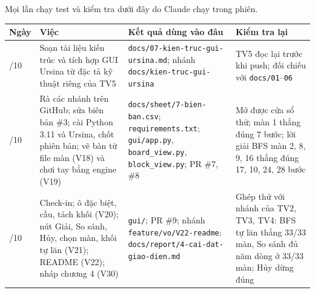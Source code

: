 Mọi lần chạy test và kiểm tra dưới đây do Claude chạy trong phiên.


{\def\LTcaptype{none} %
\begin{longtable}[]{@{}
  >{\raggedright\arraybackslash}p{}
  >{\raggedright\arraybackslash}p{}
  >{\raggedright\arraybackslash}p{}
  >{\raggedright\arraybackslash}p{}@{}}
\toprule\noalign{}
\rowcolor{tablehead}\begin{minipage}[b]{\linewidth}\raggedright
\textbf{Ngày}
\end{minipage} & \begin{minipage}[b]{\linewidth}\raggedright
\textbf{Việc}
\end{minipage} & \begin{minipage}[b]{\linewidth}\raggedright
\textbf{Kết quả dùng vào đâu}
\end{minipage} & \begin{minipage}[b]{\linewidth}\raggedright
\textbf{Kiểm tra lại}
\end{minipage} \\
\midrule\noalign{}
\endhead
\bottomrule\noalign{}
\endlastfoot
19/10 & Soạn tài liệu kiến trúc và tích hợp GUI Ursina từ đặc tả kỹ thuật riêng của TV5 & \texttt{docs/\allowbreak{}07-\allowbreak{}kien-\allowbreak{}truc-\allowbreak{}gui-\allowbreak{}ursina.\allowbreak{}md}; nhánh \texttt{docs/\allowbreak{}kien-\allowbreak{}truc-\allowbreak{}gui-\allowbreak{}ursina} & TV5 đọc lại trước khi push; đối chiếu với \texttt{docs/\allowbreak{}01}--\texttt{06} \\
\rowrule
21/10 & Rà các nhánh trên GitHub; sửa biên bản \#3; cài Python 3.11 và Ursina, chốt phiên bản; vẽ bàn từ file màn (V18) và chơi tay bằng engine (V19) & \texttt{docs/\allowbreak{}sheet/\allowbreak{}7-\allowbreak{}bien-\allowbreak{}ban.\allowbreak{}csv}; \texttt{requirements.\allowbreak{}txt}; \texttt{gui/\allowbreak{}app.\allowbreak{}py}, \texttt{board\_\allowbreak{}view.\allowbreak{}py}, \texttt{block\_\allowbreak{}view.\allowbreak{}py}; PR \#7, \#8 & Mở được cửa sổ thử; màn 1 thắng đúng 7 bước; lời giải BFS màn 2, 8, 9, 16 thắng đúng 17, 10, 24, 28 bước \\
\rowrule
23/10 & Check-in; ô đặc biệt, cầu, tách khối (V20); nút Giải, So sánh, Hủy, chọn màn, khối tự lăn (V21); README (V22); nháp chương 4 (V30) & \texttt{gui/\allowbreak{}}; PR \#9; nhánh \texttt{feature/\allowbreak{}vo/\allowbreak{}V22-\allowbreak{}readme}; \texttt{docs/\allowbreak{}report/\allowbreak{}4-\allowbreak{}cai-\allowbreak{}dat-\allowbreak{}giao-\allowbreak{}dien.\allowbreak{}md} & Ghép thử với nhánh của TV2, TV3, TV4: BFS tự lăn thắng 33/33 màn, So sánh đủ năm dòng ở 33/33 màn; Hủy dừng đúng \\

\end{longtable}}
